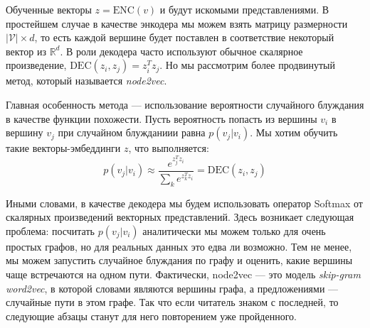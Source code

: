 \documentclass[12pt,a4paper]{article}
\newcommand{\ENC}{\text{ENC}}
\newcommand{\DEC}{\text{DEC}}
\begin{document}
\noindent
Обученные векторы $z = \ENC(v)$ и будут искомыми представлениями. В простейшем случае в качестве энкодера мы можем взять матрицу размерности $|\mathcal{V}| \times d$, то есть каждой вершине будет поставлен в соответствие некоторый вектор из $\mathbb{R}^d$. В роли декодера часто используют обычное скалярное произведение, $\DEC(z_i, z_j) = z_i^T z_j$. Но мы рассмотрим более продвинутый метод, который называется \emph{node2vec}.

Главная особенность метода --- использование вероятности случайного блуждания в качестве функции похожести. Пусть вероятность попасть из вершины $v_i$ в вершину $v_j$ при случайном блужданиии равна $p(v_j|v_i)$. Мы хотим обучить такие векторы-эмбеддинги $z$, что выполняется:
$$
p(v_j|v_i) \approx \frac{e^{z_j^T z_i}}{\sum_k e^{z_k^T z_i}} = \DEC(z_i, z_j)
$$

\noindent
Иными словами, в качестве декодера мы будем использовать оператор Softmax от скалярных произведений векторных представлений. Здесь возникает следующая проблема: посчитать $p(v_j|v_i)$ аналитически мы можем только для очень простых графов, но для реальных данных это едва ли возможно. Тем не менее, мы можем запустить случайное блуждания по графу и оценить, какие вершины чаще встречаются на одном пути. Фактически, node2vec --- это модель \emph{skip-gram word2vec}, в которой словами являются вершины графа, а предложениями --- случайные пути в этом графе. Так что если читатель знаком с последней, то следующие абзацы станут для него повторением уже пройденного.
\end{document}
